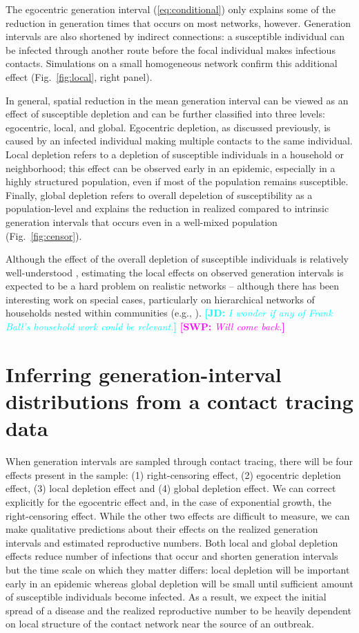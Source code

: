 \documentclass[12pt]{article}
\newcommand{\eref}[1]{(\ref{eq:#1})}
\newcommand{\fref}[1]{Fig.~\ref{fig:#1}}
\newcommand{\comment}[3]{\textcolor{#1}{\textbf{[#2: }\textsl{#3}\textbf{]}}}
\newcommand{\jd}[1]{\comment{cyan}{JD}{#1}}
\newcommand{\swp}[1]{\comment{magenta}{SWP}{#1}}
\begin{document}
The egocentric generation interval \eref{conditional} only explains some of the reduction in generation times that occurs on most networks, however.
Generation intervals are also shortened by indirect connections: a susceptible individual can be infected through another route before the focal individual makes infectious contacts.
Simulations on a small homogeneous network confirm this additional effect (\fref{local}, right panel). 

In general, spatial reduction in the mean generation interval can be viewed as an effect of susceptible depletion and can be further classified into three levels: egocentric, local, and global.
Egocentric depletion, as discussed previously, is caused by an infected individual making multiple contacts to the same individual.
Local depletion refers to a depletion of susceptible individuals in a household or neighborhood;
this effect can be observed early in an epidemic, especially in a highly structured population, even if most of the population remains susceptible.
Finally, global depletion refers to overall depeletion of susceptibility as a population-level and explains the reduction in realized compared to intrinsic generation intervals that occurs even in a well-mixed population (\fref{censor}). 

Although the effect of the overall depletion of susceptible individuals is relatively well-understood \citep{champredon2015intrinsic}, estimating the local effects on observed generation intervals is expected to be a hard problem on realistic networks -- although there has been interesting work on special cases, particularly on hierarchical networks of households nested within communities (e.g.,  \cite{tomba2010some}). \jd{I wonder if any of Frank Ball's household work could be relevant.}
\swp{Will come back.}

\section{Inferring generation-interval distributions from a contact tracing data}

When generation intervals are sampled through contact tracing, there will be four effects present in the sample: (1) right-censoring effect, (2) egocentric depletion effect, (3) local depletion effect and (4) global depletion effect.
We can correct explicitly for the egocentric effect and, in the case of exponential growth, the right-censoring effect.
While the other two effects are difficult to measure, we can make qualitative predictions about their effects on the realized generation intervals and estimated reproductive numbers. 
Both local and global depletion effects reduce number of infections that occur and shorten generation intervals but the time scale on which they matter differs:
local depletion will be important early in an epidemic whereas global depletion will be small until sufficient amount of susceptible individuals become infected.
As a result, we expect the initial spread of a disease and the realized reproductive number to be heavily dependent on local structure of the contact network near the source of an outbreak.
\end{document}
